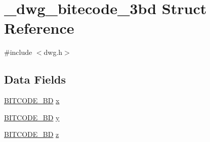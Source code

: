 \hypertarget{struct__dwg__bitecode__3bd}{\section{\-\_\-dwg\-\_\-bitecode\-\_\-3bd \-Struct \-Reference}
\label{struct__dwg__bitecode__3bd}
}


{\ttfamily \#include $<$dwg.\-h$>$}

\subsection*{\-Data \-Fields}
\begin{DoxyCompactItemize}
\item 
\hyperlink{dwg_8h_a3c1e6781466b74ba07785d57da70ed97}{\-B\-I\-T\-C\-O\-D\-E\-\_\-\-B\-D} \hyperlink{struct__dwg__bitecode__3bd_a54541117d7c055dc45e4b1811f7f31e4}{x}
\item 
\hyperlink{dwg_8h_a3c1e6781466b74ba07785d57da70ed97}{\-B\-I\-T\-C\-O\-D\-E\-\_\-\-B\-D} \hyperlink{struct__dwg__bitecode__3bd_af330c857c71800de5caf39745f45fb36}{y}
\item 
\hyperlink{dwg_8h_a3c1e6781466b74ba07785d57da70ed97}{\-B\-I\-T\-C\-O\-D\-E\-\_\-\-B\-D} \hyperlink{struct__dwg__bitecode__3bd_a3d4c8a20b5affeda73d8bc647fa2600b}{z}
\end{DoxyCompactItemize}


